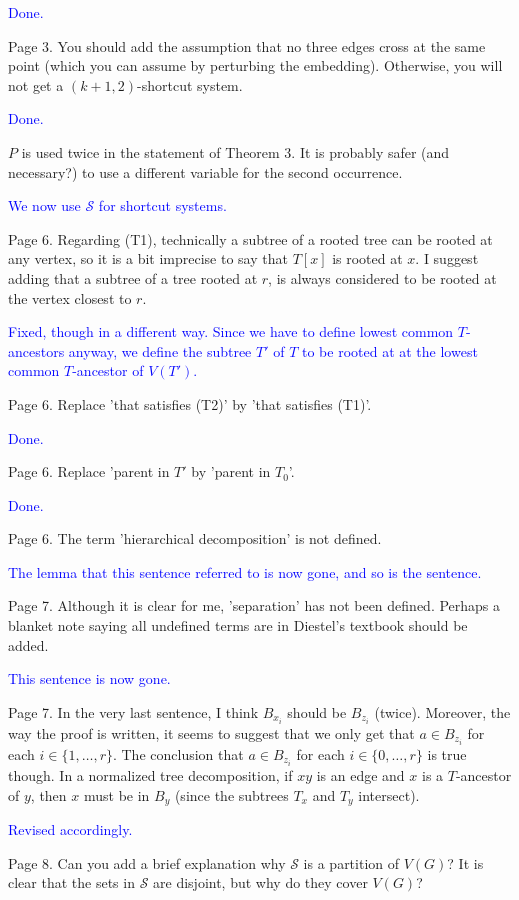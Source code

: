 \documentclass[12pt]{article}
\newcommand{\done}{\textcolor{blue}{Done.}}
\newcommand{\changed}{\textcolor{blue}{Revised accordingly.}}
\begin{document}
\done

Page 3.  You should add the assumption that no three edges cross at
the same point (which you can assume by perturbing the embedding).
Otherwise, you will not get a $(k+1, 2)$-shortcut system.

\done

$P$ is used twice in the statement of Theorem 3.  It is probably
safer (and necessary?) to use a different variable for the second
occurrence.

\textcolor{blue}{We now use $\mathcal{S}$ for shortcut systems.}

Page 6. Regarding (T1), technically a subtree of a rooted tree can be
rooted at any vertex, so it is a bit imprecise to say that $T[x]$ is
rooted at $x$.  I suggest adding that a subtree of a tree rooted at $r$,
is always considered to be rooted at the vertex closest to $r$.

\textcolor{blue}{Fixed, though in a different way.  Since we have to define lowest common $T$-ancestors anyway, we define the subtree $T'$ of $T$ to be rooted at at the lowest common $T$-ancestor of $V(T')$.}

Page 6. Replace 'that satisfies (T2)' by 'that satisfies (T1)'.

\done

Page 6. Replace 'parent in $T'$ by 'parent in $T_0$'.

\done

Page 6. The term 'hierarchical decomposition' is not defined.

\textcolor{blue}{The lemma that this sentence referred to is now gone, and so is the sentence.}

Page 7. Although it is clear for me, 'separation' has not been
defined.  Perhaps a blanket note saying all undefined terms are in
Diestel's textbook should be added.

\textcolor{blue}{This sentence is now gone.}

Page 7.  In the very last sentence, I think $B_{x_i}$ should be $B_{z_i}$
(twice).  Moreover, the way the proof is written, it seems to suggest
that we only get that $a \in B_{z_i}$ for each $i \in \{1, \dots, r\}$.
The conclusion that $a \in B_{z_i}$ for each $i \in \{0, \dots, r\}$ is
true though.  In a normalized tree decomposition, if $xy$ is an edge and
$x$ is a $T$-ancestor of $y$, then $x$ must be in $B_y$ (since the subtrees $T_x$
and $T_y$ intersect).

\changed

Page 8.  Can you add a brief explanation why $\mathcal{S}$ is a
partition of $V(G)$?  It is clear that the sets in $\mathcal{S}$ are
disjoint, but why do they cover $V(G)$?
\end{document}
